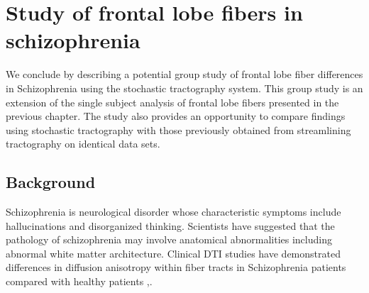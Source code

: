 \section{Study of frontal lobe fibers in schizophrenia}
We conclude by describing a potential group study of frontal lobe fiber differences in Schizophrenia using the stochastic tractography system.  This group study is an extension of the single subject analysis of frontal lobe fibers presented in the previous chapter.  The study also provides an opportunity to compare findings using stochastic tractography with those previously obtained from streamlining tractography on identical data sets.

\subsection{Background}
Schizophrenia is neurological disorder whose characteristic symptoms include hallucinations and disorganized thinking.  Scientists have suggested that the pathology of schizophrenia may involve anatomical abnormalities including abnormal white matter architecture.  Clinical DTI studies have demonstrated differences in diffusion anisotropy within fiber tracts in Schizophrenia patients compared with healthy patients \cite{kubickiBiologPsych03},\cite{kubickiNI05}.

